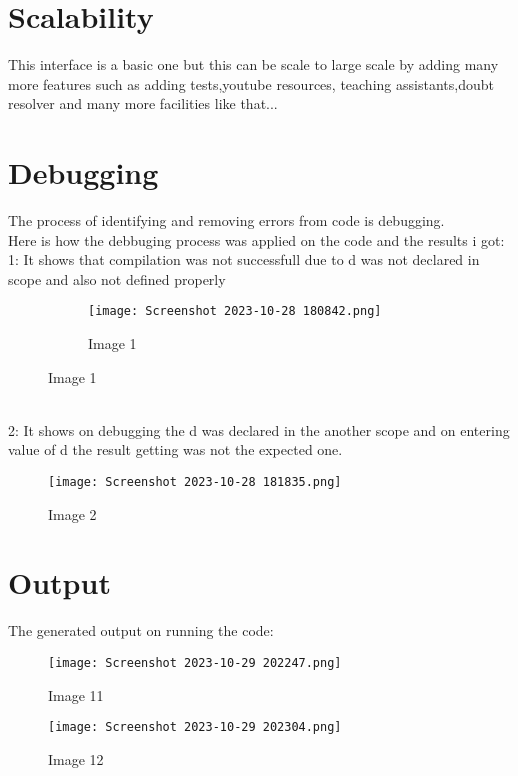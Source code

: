 \documentclass{article}
\begin{document}
 \section{Scalability}
 This interface is a basic one but this can be scale to large scale by adding many more features such as adding tests,youtube resources, teaching assistants,doubt resolver and many more facilities like that...
 \newpage %
\section{Debugging}
The process of identifying and removing errors from code is debugging.\\
Here is how the debbuging process was applied on the code and the results i got:\\

1: It shows that compilation was not successfull due to d was not declared in scope and also not defined properly\\
\begin{figure}[h]
  
  \begin{subfigure}{1.5\textwidth}
    \texttt{[image: Screenshot 2023-10-28 180842.png]}
    \caption{Image 1}
  \end{subfigure}
 
\end{figure}
\\
2: It shows on debugging the d was declared in the another scope and on entering value of d the result getting was not the expected one.\\
\begin{figure}[h]
  \centering
  \texttt{[image: Screenshot 2023-10-28 181835.png]}
  \caption{Image 2}
\end{figure}

\newpage %
\section{Output }
The generated output on running the code:
\begin{figure}[h]
  \centering
  \texttt{[image: Screenshot 2023-10-29 202247.png]}
  \caption{Image 11}
\end{figure}
\begin{figure}[h]
  \centering
  \texttt{[image: Screenshot 2023-10-29 202304.png]}
  \caption{Image 12}
\end{figure}
\newpage %
\end{document}
